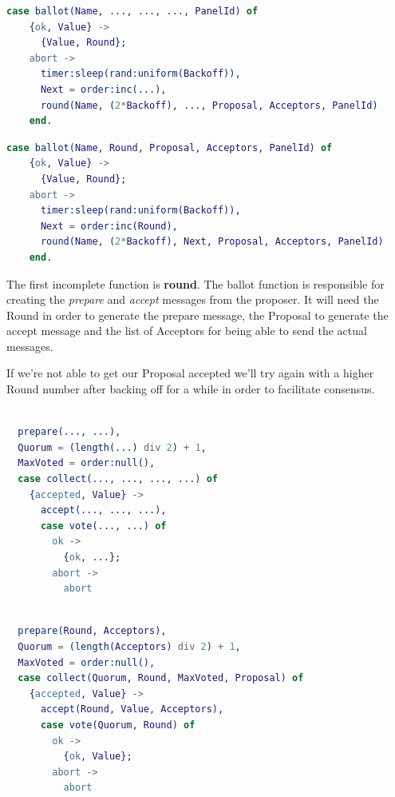 \documentclass[a4paper, 10pt]{article}
\begin{document}
    \begin{minipage}{.45\textwidth}
	\begin{lstlisting}[language=erlang, caption={Template}]
	case ballot(Name, ..., ..., ..., PanelId) of  
	{ok, Value} ->
	  {Value, Round};
	abort ->
	  timer:sleep(rand:uniform(Backoff)),
	  Next = order:inc(...),
	  round(Name, (2*Backoff), ..., Proposal, Acceptors, PanelId)
	end.
	\end{lstlisting}
    \end{minipage}\hfill
    \begin{minipage}{.45\textwidth}
	\begin{lstlisting}[language=erlang, caption={Filled version}]
	case ballot(Name, Round, Proposal, Acceptors, PanelId) of
	{ok, Value} ->
	  {Value, Round};
	abort ->
	  timer:sleep(rand:uniform(Backoff)),
	  Next = order:inc(Round),
	  round(Name, (2*Backoff), Next, Proposal, Acceptors, PanelId)
	end.
	\end{lstlisting}
    \end{minipage}

    The first incomplete function is \textbf{round}. The ballot function is responsible for creating the \textit{prepare} and \textit{accept} messages from the proposer. It will need the Round in order to generate the prepare message, the Proposal to generate the accept message and the list of Acceptors for being able to send the actual messages.

    If we're not able to get our Proposal accepted we'll try again with a higher Round number after backing off for a while in order to facilitate consensus.
  

    \begin{minipage}{.45\textwidth}
	\begin{lstlisting}[language=erlang, caption={Template}]
	
  prepare(..., ...),
  Quorum = (length(...) div 2) + 1,
  MaxVoted = order:null(),
  case collect(..., ..., ..., ...) of
    {accepted, Value} ->
      accept(..., ..., ...),
      case vote(..., ...) of
        ok ->
          {ok, ...};
        abort ->
          abort
  \end{lstlisting}
    \end{minipage}\hfill
    \begin{minipage}{.45\textwidth}
	\begin{lstlisting}[language=erlang, caption={Filled version}]
	
  prepare(Round, Acceptors),
  Quorum = (length(Acceptors) div 2) + 1,
  MaxVoted = order:null(),
  case collect(Quorum, Round, MaxVoted, Proposal) of
    {accepted, Value} ->
      accept(Round, Value, Acceptors),
      case vote(Quorum, Round) of
        ok ->
          {ok, Value};
        abort ->
          abort
	\end{lstlisting}
    \end{minipage}
\end{document}
